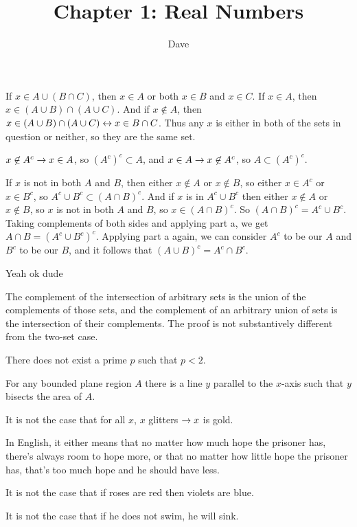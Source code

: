 \documentclass[11pt, oneside]{article}   	%
\title{Chapter 1: Real Numbers}
\author{Dave}
\begin{document}
\maketitle

\be
\item If $x \in A \cup (B \cap C)$, then $x \in A$ or both $x \in B$ and $x \in C$. If $x \in A$, then $x \in (A \cup B) \cap (A \cup C)$. And if $x \not \in A$, then $x \in (A \cup B) \cap (A \cup C) \leftrightarrow x \in B \cap C$. Thus any $x$ is either in both of the sets in question or neither, so they are the same set.
\item \be
\item $x \not \in A^c \rightarrow x \in A$, so $(A^c)^c \subset A$, and $x \in A \rightarrow x \not \in A^c$, so $A \subset (A^c)^c$. 
\item If $x$ is not in both $A$ and $B$, then either $x \not \in A$ or $x \not \in B$, so either $x \in A^c$ or $x\in B^c$, so $A^c \cup B^c \subset (A \cap B)^c$. And if $x$ is in $A^c \cup B^c$ then either $x \not \in A$ or $x \not \in B$, so $x$ is not in both $A$ and $B$, so $x \in (A \cap B)^c$. So $(A \cap B)^c = A^c \cup B^c$. Taking complements of both sides and applying part a, we get $A \cap B = (A^c \cup B^c)^c$. Applying part a again, we can consider $A^c$ to be our $A$ and $B^c$ to be our $B$, and it follows that $(A \cup B)^c = A^c \cap B^c$.
\item Yeah ok dude
\item The complement of the intersection of arbitrary sets is the union of the complements of those sets, and the complement of an arbitrary union of sets is the intersection of their complements. The proof is not substantively different from the two-set case.
\ee
\item \be
\item There does not exist a prime $p$ such that $p < 2$.
\item For any bounded plane region $A$ there is a line $y$ parallel to the $x$-axis such that $y$ bisects the area of $A$.
\item It is not the case that for all $x$, $x$ glitters $\rightarrow x$ is gold.
\ee
\item In English, it either means that no matter how much hope the prisoner has, there's always room to hope more, or that no matter how little hope the prisoner has, that's too much hope and he should have less.
\item \be
\item It is not the case that if roses are red then violets are blue.
\item It is not the case that if he does not swim, he will sink.
\end{document}
